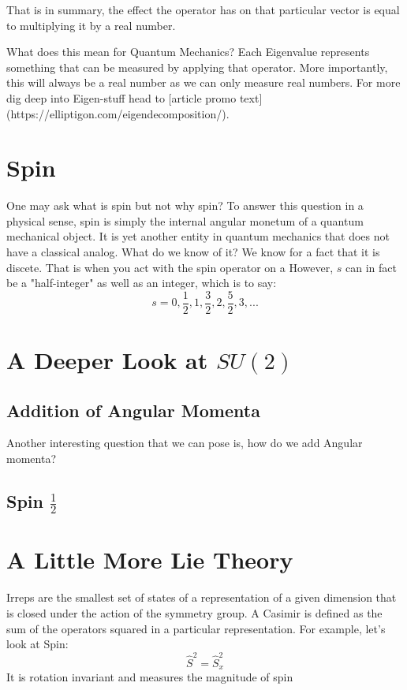 \documentclass[]{article}
\begin{document}

That is in summary, the effect the operator has on that particular vector is equal to multiplying it by a real number.


What does this mean for Quantum Mechanics? Each Eigenvalue represents something that can be measured by applying that operator. More importantly, this will always be a real number as we can only measure real numbers. For more dig deep into Eigen-stuff head to [article promo text](https://elliptigon.com/eigendecomposition/).

\section{Spin}
One may ask what is spin but not why spin? To answer this question in a physical sense, spin is simply the internal angular monetum of a quantum mechanical object. It is yet another entity in quantum mechanics that does not have a classical analog. What do we know of it? We know for a fact that it is discete. That is when you act with the spin operator on a 
However, $s$ can in fact be a "half-integer" as well as an integer, which is to say:
$$s = 0, \frac{1}{2}, 1, \frac{3}{2}, 2, \frac{5}{2}, 3, ...$$

\section{A Deeper Look at $SU(2)$}

\subsection{Addition of Angular Momenta}
Another interesting question that we can pose is, how do we add Angular momenta? 
\subsection{Spin $\frac{1}{2}$}

\section{A Little More Lie Theory}
Irreps are the smallest set of states of a representation of a given dimension that is closed under the action of the symmetry group. A Casimir is defined as the sum of the operators squared in a particular representation. For example, let's look at Spin:
\begin{equation}
\hat{S}^{2} = \hat{S}_{x}^{2}
\end{equation}
It is rotation invariant and measures the magnitude of spin
\end{document}
